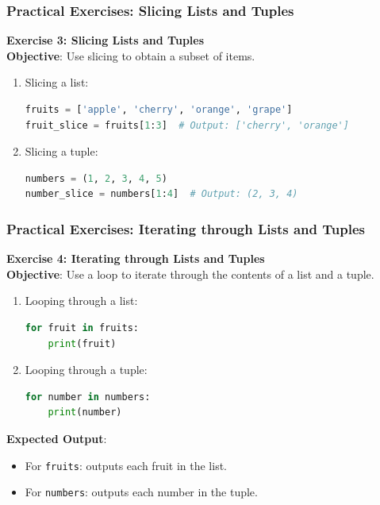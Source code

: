 \documentclass{beamer}
\begin{document}
\begin{frame}[fragile]
    \frametitle{Practical Exercises: Slicing Lists and Tuples}
    \textbf{Exercise 3: Slicing Lists and Tuples}\\
    \textbf{Objective}: Use slicing to obtain a subset of items.
    
    \begin{enumerate}
        \item Slicing a list:
        \begin{lstlisting}[language=Python]
fruits = ['apple', 'cherry', 'orange', 'grape']
fruit_slice = fruits[1:3]  # Output: ['cherry', 'orange']
        \end{lstlisting}
        \item Slicing a tuple:
        \begin{lstlisting}[language=Python]
numbers = (1, 2, 3, 4, 5)
number_slice = numbers[1:4]  # Output: (2, 3, 4)
        \end{lstlisting}
    \end{enumerate}
\end{frame}

\begin{frame}[fragile]
    \frametitle{Practical Exercises: Iterating through Lists and Tuples}
    \textbf{Exercise 4: Iterating through Lists and Tuples}\\
    \textbf{Objective}: Use a loop to iterate through the contents of a list and a tuple.
    
    \begin{enumerate}
        \item Looping through a list:
        \begin{lstlisting}[language=Python]
for fruit in fruits:
    print(fruit)
        \end{lstlisting}
        \item Looping through a tuple:
        \begin{lstlisting}[language=Python]
for number in numbers:
    print(number)
        \end{lstlisting}
    \end{enumerate}
    
    \textbf{Expected Output}:
    \begin{itemize}
        \item For \texttt{fruits}: outputs each fruit in the list.
        \item For \texttt{numbers}: outputs each number in the tuple.
    \end{itemize}
\end{frame}
\end{document}
